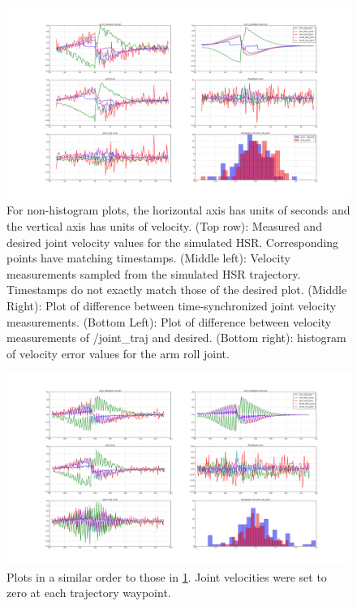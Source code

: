 \documentclass[12pt]{article}
\begin{document}
        \begin{figure}
            \includegraphics[width=\linewidth]{2020.04.03/t8/figure_1_first_100_points_20_bins_trial6.png}
            \centering
            \caption{For non-histogram plots, the horizontal axis has units of seconds and the vertical axis has units of velocity. (Top row): Measured and desired joint velocity values for the simulated HSR. Corresponding points have matching timestamps. (Middle left): Velocity measurements sampled from the simulated HSR trajectory. Timestamps do not exactly match those of the desired plot. (Middle Right): Plot of difference between time-synchronized joint velocity measurements. (Bottom Left): Plot of difference between velocity measurements of /joint\_traj and desired. (Bottom right): histogram of velocity error values for the arm roll joint.}
            \label{fig:velocityAccuracy}
        \end{figure}
        \begin{figure}[ht]
            \includegraphics[width=\linewidth]{2020.04.07/arm_vel_goals_set_to_zero.png}
            \centering
            \caption{Plots in a similar order to those in \cref{fig:velocityAccuracy}. Joint velocities were set to zero at each trajectory waypoint.}
            \label{fig:velocityZero}
        \end{figure}
\end{document}
